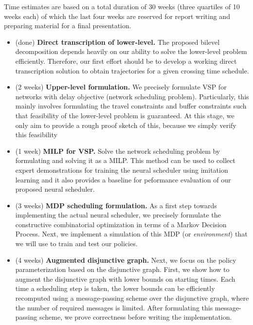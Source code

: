 \documentclass{article}
\theoremstyle{definition}
\theoremstyle{plain}
\begin{document}
Time estimates are based on a total duration of 30 weeks (three quartiles of 10
weeks each) of which the last four weeks are reserved for report writing and
preparing material for a final presentation.

\begin{itemize}
  \item (done) \textbf{Direct transcription of lower-level.} The proposed bilevel
        decomposition depends heavily on our ability to solve the lower-level
        problem efficiently. Therefore, our first effort should be to develop a
        working direct transcription solution to obtain trajectories for a given
        crossing time schedule.

  \item (2 weeks) \textbf{Upper-level formulation.} We precisely formulate VSP for
        networks with delay objective (network scheduling problem).
        Particularly, this mainly involves formulating the travel constraints
        and buffer constraints such that feasibility of the lower-level problem
        is guaranteed. At this stage, we only aim to provide a rough proof
        sketch of this, because we simply verify this feasibility


  \item (1 week) \textbf{MILP for VSP.} Solve the network scheduling problem by formulating and
        solving it as a MILP. This method can be used to collect expert
        demonstrations for training the neural scheduler using imitation
        learning and it also provides a baseline for peformance evaluation of
        our proposed neural scheduler.

  \item (3 weeks) \textbf{MDP scheduling formulation.} As a first step towards implementing
        the actual neural scheduler, we precisely formulate the constructive
        combinatorial optimization in terms of a Markov Decision Process. Next,
        we implement a simulation of this MDP (or \textit{environment}) that we will
        use to train and test our policies.

  \item (4 weeks) \textbf{Augmented disjunctive graph.} Next, we focus on the policy
        parameterization based on the disjunctive graph. First, we show how to
        augment the disjunctive graph with lower bounds on starting times. Each
        time a scheduling step is taken, the lower bounds can be efficiently
        recomputed using a message-passing scheme over the disjunctive graph,
        where the number of required messages is limited. After formulating this
        message-passing scheme, we prove correctness before writing the
        implementation.


\end{itemize}
\end{document}
